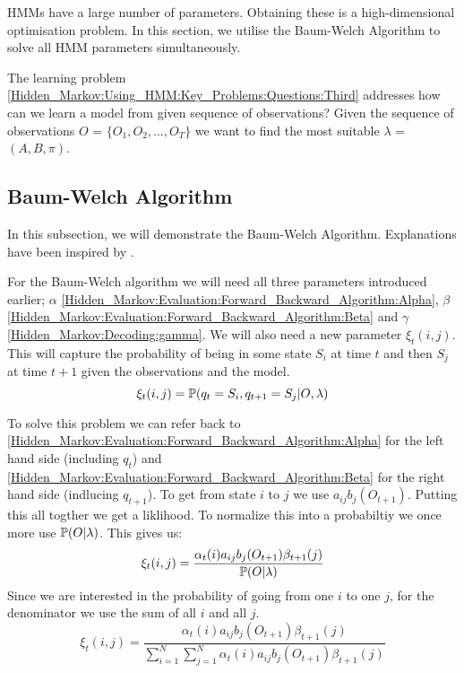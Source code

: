 HMMs have a large number of parameters. Obtaining these is a high-dimensional optimisation problem. In this section, we utilise the Baum-Welch Algorithm to solve all HMM parameters simultaneously.

The learning problem \ref{Hidden_Markov:Using_HMM:Key_Problems:Questions:Third} addresses how can we learn a model from given sequence of observations?  Given the sequence of observations $O$ = $\{O_1,O_2,...,O_T\}$ we want to find the most suitable $\lambda$ = $(A,B,\pi)$.


    \subsection{Baum-Welch Algorithm}
    \label{Hidden_Markov:Learning:Baum_Welch}

    In this subsection, we will demonstrate the Baum-Welch Algorithm. Explanations have been inspired by \cite{Baum}.

    For the Baum-Welch algorithm we will need all three parameters introduced earlier; $\alpha$ \ref{Hidden_Markov:Evaluation:Forward_Backward_Algorithm:Alpha}, $\beta$ \ref{Hidden_Markov:Evaluation:Forward_Backward_Algorithm:Beta} and $\gamma$ \ref{Hidden_Markov:Decoding:gamma}. We will also need a new parameter $\xi_t(i,j)$. This will capture the probability of being in some state $S_i$ at time $t$ and then $S_j$ at time $t+1$ given the observations and the model. 
    \begin{equation}
        \xi_t(i,j) = \mathbb{P} (q_t = S_i, q_{t+1} = S_j | O, \lambda)
    \end{equation} 

    To solve this problem we can refer back to \ref{Hidden_Markov:Evaluation:Forward_Backward_Algorithm:Alpha} for the left hand side (including $q_t$) and \ref{Hidden_Markov:Evaluation:Forward_Backward_Algorithm:Beta} for the right hand side (indlucing $q_{t+1}$). To get from state $i$ to $j$ we use $a_{ij} b_j(O_{t+1})$. Putting this all togther we get a liklihood. To normalize this into a probabiltiy we once more use $\mathbb{P} (O|\lambda)$. This gives us:
    \begin{equation}
        \xi_t(i,j) = \dfrac{\alpha_t(i) a_{ij} b_j(O_{t+1}) \beta_{t+1}(j)}{\mathbb{P} (O|\lambda)}
    \end{equation}
    Since we are interested in the probability of going from one $i$ to one $j$, for the denominator we use the sum of all $i$ and all $j$. 
    \begin{equation}
        \xi_t(i,j) = \dfrac{\alpha_t(i) a_{ij} b_j(O_{t+1}) \beta_{t+1}(j)}{\sum_{i=1}^N \sum_{j=1}^N \alpha_t(i) a_{ij} b_j(O_{t+1}) \beta_{t+1}(j)}
    \end{equation}

